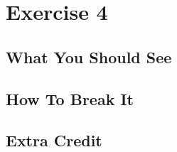 \chapter{Exercise 4}


\section{What You Should See}


\section{How To Break It}


\section{Extra Credit}



